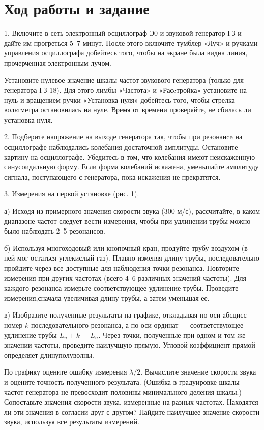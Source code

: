 \documentclass[12pt]{article}
\begin{document}
\section*{Ход работы и задание}

1. Включите в сеть электронный осциллограф Э$0$ и звуковой генератор ГЗ и дай̆те им прогреться 5–7 минут. После этого включите тумблер «Луч» и ручками управления осциллографа добейтесь того, чтобы на экране была видна линия, прочерченная электронным лучом.

Установите нулевое значение шкалы частот звукового генератора (только для генератора ГЗ-18). Для этого лимбы «Частота» и «Расcтройка» установите на нуль и вращением ручки «Установка нуля» добейтесь того, чтобы стрелка вольтметра остановилась на нуле. Время от времени проверяйте, не сбилась ли установка нуля.

2. Подберите напряжение на выходе генератора так, чтобы при резонанce на осциллографе наблюдались колебания достаточной амплитуды. Остановите картину на осциллографе. Убедитесь в том, что колебания имеют неискаженную синусоидальную форму. Если форма колебаний искажена, уменьшайте амплитуду сигнала, поступающего с генератора, пока искажения не прекратятся.

3. Измерения на первой установке (рис. 1).

а) Исходя из примерного значения скорости звука (300 м/с), рассчитайте, в каком диапазоне частот следует вести измерения, чтобы при удлинении трубы можно было наблюдать 2–5 резонансов.

б) Используя многоходовый или кнопочный кран, продуйте трубу воздухом (в ней мог остаться углекислый газ). Плавно изменяя длину трубы, последовательно пройдите через все доступные для наблюдения точки резонанса. Повторите измерения при других частотах (всего 4–6 различных значений частоты). Для каждого резонанса измерьте соответствующее удлинение трубы. Проведите измерения,сначала увеличивая длину трубы, а затем уменьшая ее.

в) Изобразите полученные результаты на графике, откладывая по оси абсцисс номер $k$ последовательного резонанса, а по оси ординат — соответствующее удлинение трубы $L_n+k$ − $L_n$. Через точки, полученные при одном и том же значении частоты, проведите наилучшую прямую. Угловой коэффициент прямой определяет длинуполуволны.

По графику оцените ошибку измерения $\lambda/2$. Вычислите значение скорости звука и оцените точность полученного результата. (Ошибка в градуировке шкалы частот генератора не превосходит половины минимального деления шкалы.) Сопоставьте значения скорости звука, измеренные на разных частотах. Находятся ли эти значения в согласии друг с другом? Найдите наилучшее значение скорости звука, используя все результаты измерений.
\end{document}
